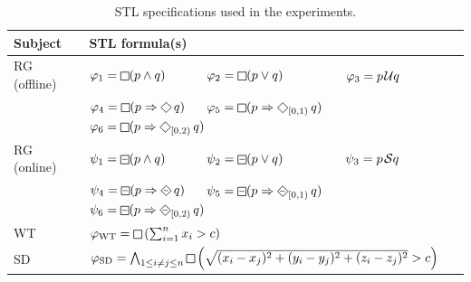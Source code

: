 \begin{table}[t]
	\centering
		\begin{tabular}{|l|l|}
			\hline
			Subject & STL formula(s) \\
			\hline
			RG (offline) & $\varphi_1 =\LTLg (p \wedge q)$ \,\,\,\,\,\,\,\,\,\,\,\,\,\,\, $\varphi_2 =\LTLg (p \lor q)$ \,\,\,\,\,\,\,\,\,\,\,\,\,\,\,\,\,\,\,\,\,\,\,\,\, $\varphi_3 = p \kern.1em\mathcal{U} q$ \\
			& $\varphi_4 = \LTLg (p \Rightarrow \LTLf q)$  \,\,\,\,\,\,  $\varphi_5 = \LTLg (p \Rightarrow \LTLf_{[0,1)} q)$ \,\,\,\,\,\, $\varphi_6 = \LTLg (p \Rightarrow \LTLf_{[0,2)} q)$ \\
			RG (online) & $\psi_1 =\LTLsquareminus (p \wedge q)$ \,\,\,\,\,\,\,\,\,\,\,\,\,\,\, $\psi_2 =\LTLsquareminus (p \lor q)$ \,\,\,\,\,\,\,\,\,\,\,\,\,\,\,\,\,\,\,\,\,\,\,\,\, $\psi_3 = p \kern.1em\mathcal{S} q$ \\
			& $\psi_4 = \LTLsquareminus (p \Rightarrow \LTLdiamondminus q)$  \,\,\,\,\,\,  $\psi_5 = \LTLsquareminus (p \Rightarrow \LTLdiamondminus_{[0,1)} q)$ \,\,\,\,\,\, $\psi_6 = \LTLsquareminus (p \Rightarrow \LTLdiamondminus_{[0,2)} q)$ \\
			WT & $\varphi_{\text{WT}} = \LTLg \left(\sum_{i=1}^{n} x_i  > c\right)$  \\
			SD & $\varphi_{\text{SD}} = \bigwedge_{1 \leq i \neq j \leq n} \LTLg \left( \sqrt{(x_i-x_j)^2 + (y_i-y_j)^2 + (z_i-z_j)^2} > c \right)$   \\
			\hline
		\end{tabular}%
	\caption{STL specifications used in the experiments.}
	\label{tab:spec} 
\end{table}

